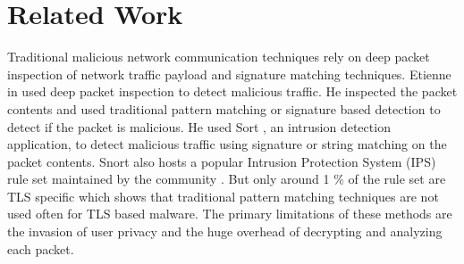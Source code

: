 \chapter{Related Work\label{chap:related}}

%
%
%
%	
%	
%
%
%

Traditional malicious network communication techniques rely on deep packet inspection of network traffic payload and signature matching techniques. Etienne in \cite{Etienne} used deep packet inspection to detect malicious traffic. He inspected the packet contents and used traditional pattern matching or signature based detection to detect if the packet is malicious. He used Sort \cite{Snort}, an intrusion detection application, to detect malicious traffic using signature or string matching on the packet contents. Snort also hosts a popular Intrusion Protection System (IPS) rule set maintained by the community \cite{SnortCR}. But only around 1 \% of the rule set are TLS specific which shows that traditional pattern matching techniques are not used often for TLS based malware. The primary limitations of these methods are the invasion of user privacy and the huge overhead of decrypting and analyzing each packet.

